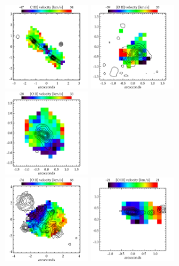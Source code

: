 \begin{figure}
    \includegraphics[width=0.33\textwidth]{fig_kinematics/v_02389.pdf}
    \includegraphics[width=0.33\textwidth]{fig_kinematics/v_02806.pdf}
    \includegraphics[width=0.33\textwidth]{fig_kinematics/v_03746.pdf}\\
    \includegraphics[width=0.33\textwidth]{fig_kinematics/v_04054.pdf}
    \includegraphics[width=0.33\textwidth]{fig_kinematics/v_683.pdf}

\end{figure}
